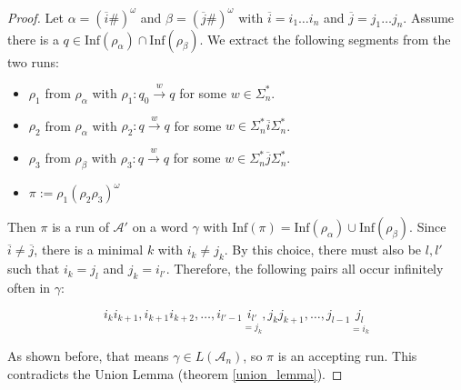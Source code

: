 \documentclass{article}
\begin{document}
\begin{proof}
	Let $\alpha = (\overline{i} \#)^\omega$ and $\beta = (\overline{j} \#)^\omega$ with $\overline{i} = i_1 \dots i_n$ and $\overline{j} = j_1 \dots j_n$. Assume there is a $q \in \text{Inf}(\rho_\alpha) \cap \text{Inf}(\rho_\beta)$. We extract the following segments from the two runs:
	\begin{itemize}
		\item $\rho_1$ from $\rho_\alpha$ with $\rho_1: q_0 \overset{w}{\rightarrow} q$ for some $w \in \Sigma_n^*$.
		\item $\rho_2$ from $\rho_\alpha$ with $\rho_2: q \overset{w}{\rightarrow} q$ for some $w \in \Sigma_n^* \overline{i} \Sigma_n^*$.
		\item $\rho_3$ from $\rho_\beta$ with $\rho_3: q \overset{w}{\rightarrow} q$ for some $w \in \Sigma_n^* \overline{j} \Sigma_n^*$.
		\item $\pi := \rho_1 (\rho_2 \rho_3)^\omega$
	\end{itemize}
	Then $\pi$ is a run of $\mathcal{A}'$ on a word $\gamma$ with $\text{Inf}(\pi) = \text{Inf}(\rho_\alpha) \cup \text{Inf}(\rho_\beta)$. Since $\overline{i} \neq \overline{j}$, there is a minimal $k$ with $i_k \neq j_k$. By this choice, there must also be $l, l'$ such that $i_k = j_l$ and $j_k = i_{l'}$. Therefore, the following pairs all occur infinitely often in $\gamma$: 
	
	$$ i_k i_{k+1}, i_{k+1} i_{k+2}, \dots, i_{l'-1} \underset{=j_k}{i_{l'}}, j_k j_{k+1}, \dots, j_{l-1} \underset{=i_k}{j_l} $$
	
	As shown before, that means $\gamma \in L(\mathcal{A}_n)$, so $\pi$ is an accepting run. This contradicts the Union Lemma (theorem \ref{union_lemma}).
\end{proof}
\end{document}
